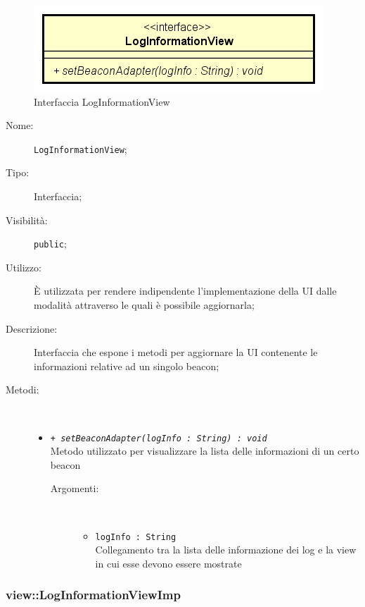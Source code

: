 \documentclass[../DefinizioneDiProdotto.tex]{subfiles}
\begin{document}
    \begin{figure}[H]
        \centering
        \includegraphics{img/LogInformationView.png}
        \caption{Interfaccia LogInformationView}\label{fig:view::LogInformationView} 
    \end{figure}
    \begin{description}
\item[Nome:] \texttt{LogInformationView};
\item[Tipo:] Interfaccia;
\item[Visibilità:] \texttt{public};
\item[Utilizzo:] È utilizzata per rendere indipendente l'implementazione della UI dalle modalità attraverso le quali è possibile aggiornarla;
\item[Descrizione:] Interfaccia che espone i metodi per aggiornare la UI contenente le informazioni relative ad un singolo beacon;
\item[Metodi:] \
\begin{itemize}
\item \texttt{+ \textit{setBeaconAdapter(logInfo : String) : void}}\\
Metodo utilizzato per visualizzare la lista delle informazioni di un certo beacon
 \begin{description}
\item[Argomenti:] \
\begin{itemize}
\item \texttt{logInfo : String}\\
Collegamento tra la lista delle informazione dei log e la view in cui esse devono essere mostrate\end{itemize}
\end{description}
\end{itemize}
\end{description}

\subsubsection{view::LogInformationViewImp}
\end{document}
